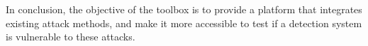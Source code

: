 In conclusion, the objective of the toolbox is to provide a platform that integrates existing attack methods, and make it more accessible to test if a detection system is vulnerable to these attacks.


